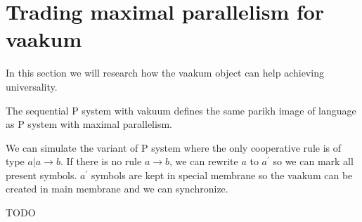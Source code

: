 \documentclass[a4paper,10pt]{article}
\begin{document}

\section{Trading maximal parallelism for vaakum}
In this section we will research how the vaakum object can help achieving universality.

\begin{veta}
  The sequential P system with vakuum defines the same parikh image of language as P system with maximal parallelism.
\end{veta}

\begin{dokaz}
  We can simulate the variant of P system where the only cooperative rule is of type $a|a \rightarrow b$. If there is no rule $a \rightarrow b$, we can rewrite $a$ to $a^{\prime}$ so we can mark all present symbols. $a^{\prime}$ symbols are kept in special membrane so the vaakum can be created in main membrane and we can synchronize.

  TODO %
\end{dokaz}


\end{document}
